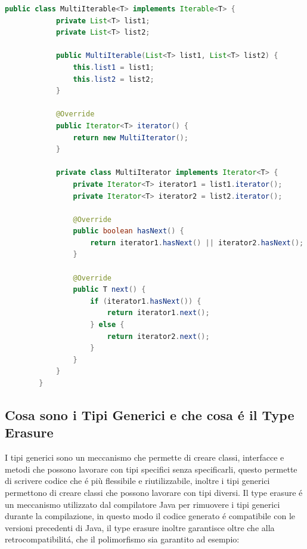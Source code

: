 \documentclass[11pt]{article}
\begin{document}
    \begin{lstlisting}[language=Java]
        public class MultiIterable<T> implements Iterable<T> {
            private List<T> list1;
            private List<T> list2;

            public MultiIterable(List<T> list1, List<T> list2) {
                this.list1 = list1;
                this.list2 = list2;
            }

            @Override
            public Iterator<T> iterator() {
                return new MultiIterator();
            }

            private class MultiIterator implements Iterator<T> {
                private Iterator<T> iterator1 = list1.iterator();
                private Iterator<T> iterator2 = list2.iterator();

                @Override
                public boolean hasNext() {
                    return iterator1.hasNext() || iterator2.hasNext();
                }

                @Override
                public T next() {
                    if (iterator1.hasNext()) {
                        return iterator1.next();
                    } else {
                        return iterator2.next();
                    }
                }
            }
        }
    \end{lstlisting}
    \subsection{Cosa sono i Tipi Generici e che cosa é il Type Erasure}
    I tipi generici sono un meccanismo che permette di creare classi, interfacce e metodi che possono lavorare con tipi specifici senza specificarli,
    questo permette di scrivere codice che é più flessibile e riutilizzabile, inoltre i tipi generici permettono di creare classi che possono lavorare con tipi diversi.
    Il type erasure é un meccanismo utilizzato dal compilatore Java per rimuovere i tipi generici durante la compilazione, in questo modo il codice generato é compatibile con le versioni precedenti di Java,
    il type erasure inoltre garantisce oltre che alla retrocompatibilitá, che il polimorfismo sia garantito ad esempio:
\end{document}
